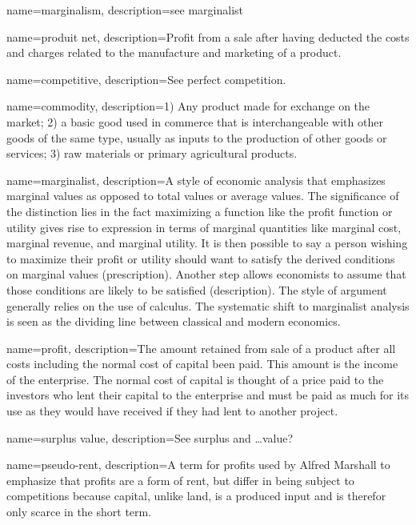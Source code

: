 {
name=marginalism,
description={see \gls{marginalist}}
}

{
name=produit net,
description={Profit from a sale after having deducted the costs and charges related to the manufacture and marketing of a product.}
}

{
name=competitive,
description={See \gls{perfect competition}.}
}

{
name=commodity,
description={1) Any product  made for exchange on the market; 2) a basic good used in commerce that is interchangeable with other goods of the same type, usually  as inputs to the production of other goods or services; 3) raw materials or primary agricultural products.}
}

{
name=marginalist,
description={A style of economic analysis that emphasizes marginal values as opposed to total values or average values. The significance of the distinction lies in the fact maximizing a function like the profit function or utility gives rise to expression in terms of marginal quantities like marginal cost, marginal revenue, and marginal utility. It is then possible to say a person wishing to maximize their profit or utility should want to satisfy the derived conditions on marginal values (prescription). Another step allows economists to assume that those conditions are likely to be satisfied (description). The style of argument generally relies on the use of calculus. The systematic shift to marginalist analysis is seen as the dividing line between classical and modern economics.}
}

{
name=profit,
description={The amount retained from sale of a product after all costs including the normal cost of capital  been paid. This amount is the income of the enterprise. The normal cost of capital is thought of a price paid to the investors who lent their capital to the enterprise and must be paid as  much for its use as they would have received if they had lent to another project. }
}

{
name=surplus value,
description={See \gls{surplus} and \dots value?}
}

{
name=pseudo-rent,
description={A term for profits used by Alfred Marshall to emphasize that profits are a form of rent, but differ in being subject to competitions  because capital, unlike land, is a produced input and is therefor only scarce in the short term. }
}

